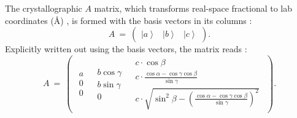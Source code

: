 The crystallographic $A$ matrix, which transforms real-space fractional to lab coordinates (\AA) \cite{Lumsden2005},
is formed with the basis vectors in its columns \cite[p. 631]{Arens2015}:
\begin{equation}
	A \ =\  \left(
		\begin{array}{ccc}
			\left| a \right> & \left| b \right> & \left| c \right>
		\end{array}
	\right).
\end{equation}
Explicitly written out using the basis vectors, the matrix reads \cite{wiki_fractional}:
\begin{equation}
	A \ =\  \left(
		\begin{array}{ccc}
			\begin{array}{c} a \\ 0 \\ 0 \end{array}
			& 
			\begin{array}{c} b \cos \gamma \\ b \sin \gamma \\ 0 \end{array} 
			& 
			\begin{array}{c}
				c \cdot \cos \beta \\
				c \cdot \frac{\cos \alpha - \cos \gamma \cos \beta}{\sin \gamma} \\
				c \cdot \sqrt{ \sin^2 \beta - \left(\frac{\cos \alpha - \cos \gamma \cos \beta}{\sin \gamma} \right)^2 }
			\end{array}
		\end{array}
	\right).
\end{equation}


